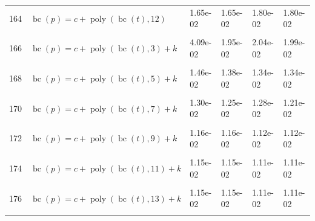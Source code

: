 \documentclass[12pt,a4paper]{article}
\DeclareMathOperator{\bc}{bc}
\DeclareMathOperator{\poly}{poly}
\begin{document}
\begin{longtable}[t]{ll>{\raggedleft\arraybackslash}p{2cm}>{\raggedleft\arraybackslash}p{2cm}>{\raggedleft\arraybackslash}p{2cm}>{\raggedleft\arraybackslash}p{2cm}}
164 & $\bc(p) = c + \poly\left( \bc(t), 12 \right)$ & 1.65e-02 & 1.65e-02 & 1.80e-02 & 1.80e-02\\
\cellcolor{gray!6}{165} & \cellcolor{gray!6}{$\bc(p) = c + \poly\left( \bc(t), 13 \right)$} & \cellcolor{gray!6}{1.65e-02} & \cellcolor{gray!6}{1.65e-02} & \cellcolor{gray!6}{1.80e-02} & \cellcolor{gray!6}{1.80e-02}\\
166 & $\bc(p) = c + \poly\left( \bc(t), 3 \right) + k$ & 4.09e-02 & 1.95e-02 & 2.04e-02 & 1.99e-02\\
\cellcolor{gray!6}{167} & \cellcolor{gray!6}{$\bc(p) = c + \poly\left( \bc(t), 4 \right) + k$} & \cellcolor{gray!6}{2.42e-02} & \cellcolor{gray!6}{2.24e-02} & \cellcolor{gray!6}{2.40e-02} & \cellcolor{gray!6}{2.35e-02}\\
168 & $\bc(p) = c + \poly\left( \bc(t), 5 \right) + k$ & 1.46e-02 & 1.38e-02 & 1.34e-02 & 1.34e-02\\
\cellcolor{gray!6}{169} & \cellcolor{gray!6}{$\bc(p) = c + \poly\left( \bc(t), 6 \right) + k$} & \cellcolor{gray!6}{1.30e-02} & \cellcolor{gray!6}{1.25e-02} & \cellcolor{gray!6}{1.27e-02} & \cellcolor{gray!6}{1.21e-02}\\
170 & $\bc(p) = c + \poly\left( \bc(t), 7 \right) + k$ & 1.30e-02 & 1.25e-02 & 1.28e-02 & 1.21e-02\\
\cellcolor{gray!6}{171} & \cellcolor{gray!6}{$\bc(p) = c + \poly\left( \bc(t), 8 \right) + k$} & \cellcolor{gray!6}{1.16e-02} & \cellcolor{gray!6}{1.16e-02} & \cellcolor{gray!6}{1.12e-02} & \cellcolor{gray!6}{1.12e-02}\\
172 & $\bc(p) = c + \poly\left( \bc(t), 9 \right) + k$ & 1.16e-02 & 1.16e-02 & 1.12e-02 & 1.12e-02\\
\cellcolor{gray!6}{173} & \cellcolor{gray!6}{$\bc(p) = c + \poly\left( \bc(t), 10 \right) + k$} & \cellcolor{gray!6}{1.15e-02} & \cellcolor{gray!6}{1.15e-02} & \cellcolor{gray!6}{1.11e-02} & \cellcolor{gray!6}{1.11e-02}\\
174 & $\bc(p) = c + \poly\left( \bc(t), 11 \right) + k$ & 1.15e-02 & 1.15e-02 & 1.11e-02 & 1.11e-02\\
\cellcolor{gray!6}{175} & \cellcolor{gray!6}{$\bc(p) = c + \poly\left( \bc(t), 12 \right) + k$} & \cellcolor{gray!6}{1.15e-02} & \cellcolor{gray!6}{1.15e-02} & \cellcolor{gray!6}{1.11e-02} & \cellcolor{gray!6}{1.11e-02}\\
176 & $\bc(p) = c + \poly\left( \bc(t), 13 \right) + k$ & 1.15e-02 & 1.15e-02 & 1.11e-02 & 1.11e-02\\
\cellcolor{gray!6}{177} & \cellcolor{gray!6}{$\bc(p) = c + \poly\left( \bc(t), 3 \right) * k$} & \cellcolor{gray!6}{3.74e-02} & \cellcolor{gray!6}{1.56e-02} & \cellcolor{gray!6}{1.71e-02} & \cellcolor{gray!6}{1.65e-02}\\

\end{longtable}
\end{document}
